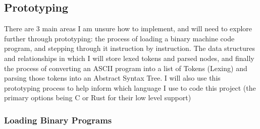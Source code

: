 \subsection{Prototyping}
There are 3 main areas I am unsure how to implement, and will need to explore further through prototyping: the process of loading a binary machine code program, and stepping through it instruction by instruction. The data structures and relationships in which I will store lexed tokens and parsed nodes, and finally the process of converting an ASCII program into a list of Tokens (Lexing) and parsing those tokens into an Abstract Syntax Tree. I will also use this prototyping process to help inform which language I use to code this project (the primary options being C or Rust for their low level support)

\subsubsection{Loading Binary Programs}

